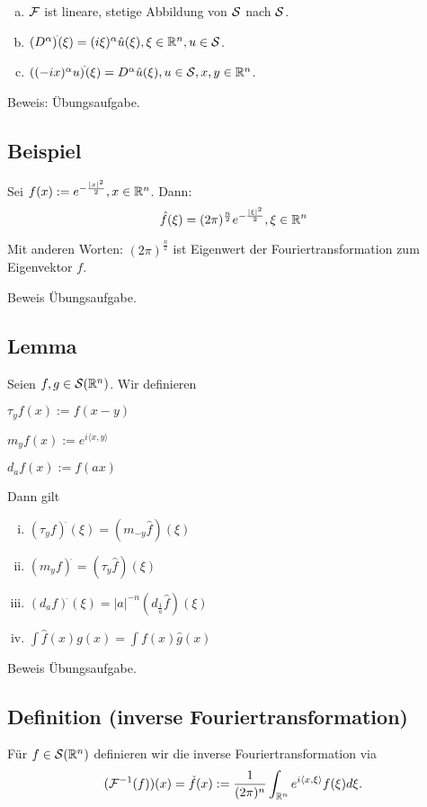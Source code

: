\begin{enumerate}[a)]
  \item $\mathcal{F}$ ist lineare, stetige Abbildung von $\mathcal{S}$ nach $\mathcal{S}$.
  \item $(D^\alpha)^{\hat{}} (\xi) = (i\xi)^\alpha \hat u(\xi), \xi \in \mathbb{R}^n, u \in \mathcal{S}$.
  \item $((-ix)^\alpha u)^{\hat{}} (\xi) = D^\alpha \hat u (\xi), u \in \mathcal{S}, x, y \in \mathbb{R}^n$.
\end{enumerate}

Beweis: Übungsaufgabe.

\subsection{Beispiel}

Sei $f(x) := e^{-\frac{|x|^2}{2}}, x \in \mathbb{R}^n$.
Dann: 
$$
\hat f(\xi) = (2\pi)^{\frac{n}{2}} e^{-\frac{|\xi|^2}{2}}, \xi \in \mathbb{R}^n
$$

Mit anderen Worten: $(2\pi)^{\frac{n}{2}}$ ist Eigenwert der Fouriertransformation zum Eigenvektor $f$.

Beweis Übungsaufgabe.

\subsection {Lemma}

Seien $f,g \in \mathcal{S}(\mathbb{R}^n)$. Wir definieren

$\tau_y f(x) := f(x-y)$

$m_y f(x) := e^{i \langle x, y \rangle}$

$d_a f(x) := f(ax)$

Dann gilt
\begin{enumerate}[i)]
  \item $(\tau_y f)^{\hat{}} (\xi) = (m_{-y} \hat f) (\xi)$
  \item $(m_y f)^{\hat{}} = (\tau_y \hat f)(\xi)$
  \item $(d_a f)^{\hat{}}(\xi) = |a|^{-n} (d_{\frac{1}{a}} \hat f) (\xi)$
  \item $\int \hat f(x) g(x) = \int f(x) \hat g(x)$
\end{enumerate}

Beweis Übungsaufgabe.

\subsection{Definition (inverse Fouriertransformation)}

Für $f \in \mathcal{S}(\mathbb{R}^n)$ definieren wir die inverse Fouriertransformation via
$$
(\mathcal{F}^{-1}(f))(x) = \check f(x) := \frac{1}{(2\pi)^n} \int_{\mathbb{R}^n} e^{i \langle x, \xi \rangle} f(\xi) d\xi.
$$


